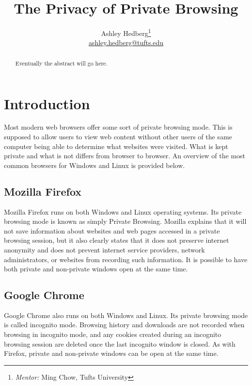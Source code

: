 \documentclass[pdftex,letterpaper,titlepage,11pt]{article}
\begin{document}
  \title{The Privacy of Private Browsing}
  \author{Ashley Hedberg\thanks{\emph{Mentor:} Ming Chow, Tufts University} \\
  \href{mailto:ashley.hedberg@tufts.edu}{ashley.hedberg@tufts.edu}}
  \date{}
  \maketitle
  
  \begin{abstract}
  Eventually the abstract will go here.
  \end{abstract}

  \section{Introduction}
  Most modern web browsers offer some sort of private browsing mode. This is
  supposed to allow users to view web content without other users of the same
  computer being able to determine what websites were visited. What is kept
  private and what is not differs from browser to browser. An overview of the
  most common browsers for Windows and Linux is provided below.

    \subsection{Mozilla Firefox}
    Mozilla Firefox runs on both Windows and Linux operating systems. Its
    private browsing mode is known as simply Private Browsing. Mozilla explains
    that it will not save information about websites and web pages accessed in
    a private browsing session, but it also clearly states that it does not
    preserve internet anonymity and does not prevent internet service
    providers, network administrators, or websites from recording such
    information. It is possible to have both private and non-private windows
    open at the same time.\cite{verdi13}

    \subsection{Google Chrome}
    Google Chrome also runs on both Windows and Linux. Its private browsing
    mode is called incognito mode. Browsing history and downloads are not
    recorded when browsing in incognito mode, and any cookies created during
    an incognito browsing session are deleted once the last incognito window is
    closed. As with Firefox, private and non-private windows can be open at the
    same time.\cite{google13}
\end{document}
